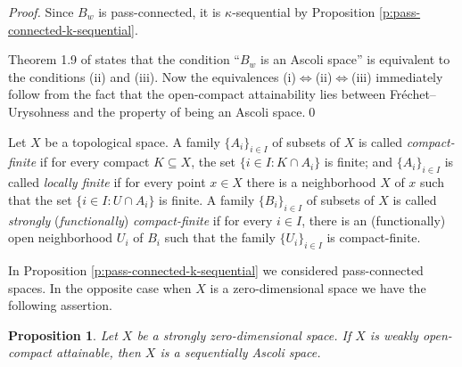 \documentclass[preprint,11pt]{elsarticle}
\newtheorem{proposition}[theorem]{Proposition}
\numberwithin{equation}{section}
\numberwithin{theorem}{section}
\newcommand{\LRa}{\Leftrightarrow}
\begin{document}
\begin{proof}
Since $B_w$ is pass-connected, it is $\kappa$-sequential by Proposition \ref{p:pass-connected-k-sequential}.

Theorem 1.9 of \cite{GKP} states that the condition ``$B_w$ is an Ascoli space'' is equivalent to the conditions (ii) and (iii). Now the equivalences (i)$\LRa$(ii)$\LRa$(iii) immediately follow from the fact that the open-compact attainability lies between Fr\'{e}chet--Urysohness and the property of being an Ascoli space.\qed
\end{proof}

Let $X$ be a topological space. A family  $\{ A_i\}_{i\in I}$ of subsets of  $X$ is called {\em compact-finite} if for every compact $K\subseteq X$, the set $\{ i\in I: K\cap A_i\}$ is finite; and $\{ A_i\}_{i\in I}$ is called {\em locally finite} if for every point $x\in X$ there is a neighborhood $X$ of $x$ such that the set $\{ i\in I: U\cap A_i\}$ is finite. A family  $\{ B_i\}_{i\in I}$ of subsets of  $X$ is called {\em strongly} ({\em functionally}) {\em compact-finite} if for every $i\in I$, there is an (functionally) open neighborhood  $U_i$ of $B_i$ such that the family $\{ U_i\}_{i\in I}$ is compact-finite.


In Proposition \ref{p:pass-connected-k-sequential} we considered pass-connected spaces. In the opposite case when $X$ is a zero-dimensional space we have the following assertion.

\begin{proposition} \label{p:zpwoca-dim-Ascoli}
Let $X$ be a strongly zero-dimensional space. If $X$ is weakly open-compact attainable, then $X$ is a sequentially Ascoli space.
\end{proposition}
\end{document}
